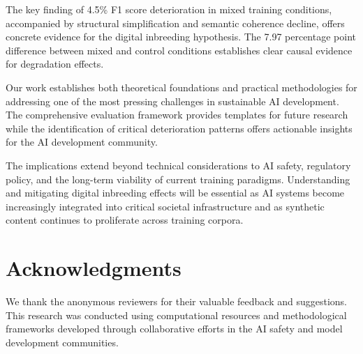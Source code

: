 \documentclass{article}
\begin{document}
The key finding of 4.5\% F1 score deterioration in mixed training conditions, accompanied by structural simplification and semantic coherence decline, offers concrete evidence for the digital inbreeding hypothesis. The 7.97 percentage point difference between mixed and control conditions establishes clear causal evidence for degradation effects.

Our work establishes both theoretical foundations and practical methodologies for addressing one of the most pressing challenges in sustainable AI development. The comprehensive evaluation framework provides templates for future research while the identification of critical deterioration patterns offers actionable insights for the AI development community.

The implications extend beyond technical considerations to AI safety, regulatory policy, and the long-term viability of current training paradigms. Understanding and mitigating digital inbreeding effects will be essential as AI systems become increasingly integrated into critical societal infrastructure and as synthetic content continues to proliferate across training corpora.

\section*{Acknowledgments}

We thank the anonymous reviewers for their valuable feedback and suggestions. This research was conducted using computational resources and methodological frameworks developed through collaborative efforts in the AI safety and model development communities.



\end{document}
